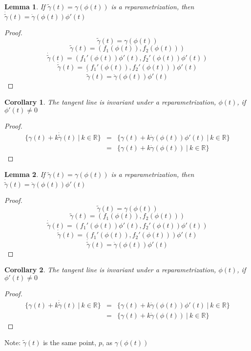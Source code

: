 \documentclass[twocolumn,20pt,fleqn]{extarticle}
\theoremstyle{plain}
\newtheorem*{lemma}{Lemma}
\newtheorem*{corollary}{Corollary}
\theoremstyle{definition}
\theoremstyle{remark}
\begin{document}
\clearpage



\begin{lemma}
If $\tilde{\gamma}(t) = \gamma(\phi(t))$ is a reparametrization, then $\dot{\tilde{\gamma}}(t) = \dot{\gamma}(\phi(t))\phi'(t)$
\end{lemma}
\begin{proof}
\[\tilde{\gamma}(t) = \gamma(\phi(t))\]
\[\tilde{\gamma}(t) = (f_1(\phi(t)), f_2(\phi(t)))\]
\[\dot{\tilde{\gamma}}(t) = (f_1'(\phi(t))\phi'(t), f_2'(\phi(t))\phi'(t))\]
\[\dot{\tilde{\gamma}}(t) = (f_1'(\phi(t)), f_2'(\phi(t)))\phi'(t)\]
\[\dot{\tilde{\gamma}}(t) = \dot{\gamma}(\phi(t))\phi'(t)\]
\end{proof}

\begin{corollary}
The tangent line is invariant under a reparametrization, $\phi(t)$,  if $\phi'(t)\neq 0$ 
\end{corollary}
\begin{proof}
\begin{eqnarray*}
\{\gamma(t) + k\dot{\tilde{\gamma}}(t) \ |\ k\in \mathbb{R}\} &=& \{\gamma(t) + k\dot{\gamma}(\phi(t))\phi'(t) \ |\ k\in \mathbb{R}\} \\ 
                                                  &=& \{\gamma(t) + k\dot{\gamma}(\phi(t)) \ |\ k\in \mathbb{R}\}
\end{eqnarray*}
\end{proof}
\newpage



\clearpage



\begin{lemma}
If $\tilde{\gamma}(t) = \gamma(\phi(t))$ is a reparametrization, then $\dot{\tilde{\gamma}}(t) = \dot{\gamma}(\phi(t))\phi'(t)$
\end{lemma}
\begin{proof}
\[\tilde{\gamma}(t) = \gamma(\phi(t))\]
\[\tilde{\gamma}(t) = (f_1(\phi(t)), f_2(\phi(t)))\]
\[\dot{\tilde{\gamma}}(t) = (f_1'(\phi(t))\phi'(t), f_2'(\phi(t))\phi'(t))\]
\[\dot{\tilde{\gamma}}(t) = (f_1'(\phi(t)), f_2'(\phi(t)))\phi'(t)\]
\[\dot{\tilde{\gamma}}(t) = \dot{\gamma}(\phi(t))\phi'(t)\]
\end{proof}

\begin{corollary}
The tangent line is invariant under a reparametrization, $\phi(t)$,  if $\phi'(t)\neq 0$ 
\end{corollary}
\begin{proof}
\begin{eqnarray*}
\{\gamma(t) + k\dot{\tilde{\gamma}}(t) \ |\ k\in \mathbb{R}\} &=& \{\gamma(t) + k\dot{\gamma}(\phi(t))\phi'(t) \ |\ k\in \mathbb{R}\} \\ 
                                                  &=& \{\gamma(t) + k\dot{\gamma}(\phi(t)) \ |\ k\in \mathbb{R}\}
\end{eqnarray*}
\end{proof}
\newpage
Note: $\tilde{\gamma}(t)$ is the same point, $p$, as $\gamma(\phi(t))$
\end{document}
